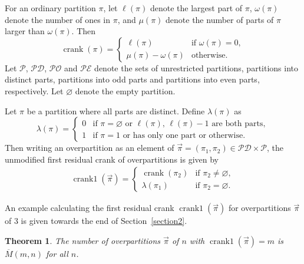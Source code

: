 \documentclass[10pt,a4paper]{amsart}
\numberwithin{equation}{section}
\newtheorem{Theorem}{Theorem}[section]
\newcommand\mylabel[1]{\label{#1}}
\begin{document}
For an ordinary partition $\pi$, let $\ell(\pi)$ denote the largest part of $\pi$, $\omega(\pi)$
denote the number of ones in $\pi$, and $\mu(\pi)$ denote the number of parts of $\pi$
larger than $\omega(\pi)$.
Then
\begin{equation*}%
\operatorname{crank}(\pi)=\begin{cases}
\ell(\pi) & \mbox{if $\omega(\pi)=0$}, \\
\mu(\pi)-\omega(\pi) & \mbox{otherwise}.
\end{cases}
\end{equation*}%
Let $\mathcal{P}$, $\mathcal{PD}$, $\mathcal{PO}$ and $\mathcal{PE}$ denote the sets of unrestricted partitions, partitions into distinct parts, partitions into odd parts and partitions into even parts, respectively. Let $\varnothing$ denote the empty partition.
\begin{Definition}
Let $\pi$ be a partition where all parts are distinct. Define $\lambda(\pi)$ as
\begin{equation*}%
\lambda(\pi)=\begin{cases}
0 & \mbox{if $\pi=\varnothing$ or $\ell(\pi), \,\ell(\pi)-1$ are both parts},
\\
1 & \mbox{if $\pi=1$ or has only one part or otherwise.}
\end{cases}
\end{equation*}%
Then writing an overpartition as an element of $\vec{\pi}=(\pi_1,\pi_2) \in \mathcal{PD} \times \mathcal{P}$, the unmodified first residual crank of overpartitions is given by
\begin{align}
\mylabel{eq:crank1}
\operatorname{crank1}(\vec{\pi})=\begin{cases}
\operatorname{crank}(\pi_2) & \mbox{if $\pi_2 \neq \varnothing$},
\\
\lambda(\pi_1) & \mbox{if $\pi_2 = \varnothing$.}
\end{cases}
\end{align}
\end{Definition}

An example calculating the first residual crank $\operatorname{crank1}(\vec{\pi})$ for overpartitions $\vec{\pi}$ of $3$ is given towards the end of Section~\ref{section2}.

\begin{Theorem}
\mylabel{thm:M1}
The number of overpartitions $\vec{\pi}$ of $n$ with $\operatorname{crank1}(\vec{\pi})=m$ is $\overline{M}(m,n)$ for all $n$.
\end{Theorem}
\end{document}
